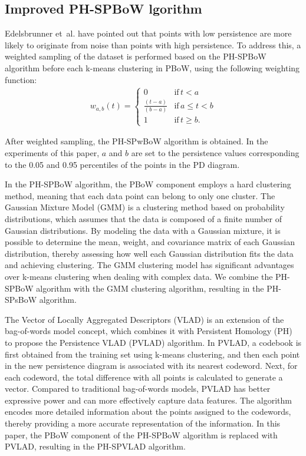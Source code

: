 \documentclass[5GeSdc,ASOC,numref,printGA,printHL,CASflow,nocrossmark,longtitle,PROOF]{/usr/local/texlive/iTemplates/01-Templates/01-Els-Jnl/01-Standard_Templates/V1/ELS_MDL5-V1-6}
\begin{document}
\begin{articlestyle}
\subsection{Improved PH-SPBoW lgorithm}\label{sec3.4}

Edelsbrunner et~al. \cite{edelsbrunner2010computational} have pointed out that points with low persistence are more likely to originate from noise than points with high persistence. To address this, a weighted sampling of the dataset is performed based on the PH-SPBoW algorithm before each k-means clustering in PBoW, using the following weighting function:  
\begin{align*}  
w_{a,b}(t) =  
\begin{cases}   
	0 & \text{if}\,t < a \\
	\frac{(t-a)}{(b-a)} & \text{if}\,a \leq t < b \\
	1 & \text{if}\,t \geq b.
\end{cases}  
\end{align*}  

After weighted sampling, the PH-SPwBoW algorithm is obtained. In the experiments of this paper, $ a $ and $ b $ are set to the persistence values corresponding to the 0.05 and 0.95 percentiles of the points in the PD diagram.  

In the PH-SPBoW algorithm, the PBoW component employs a hard clustering method, meaning that each data point can belong to only one cluster. The Gaussian Mixture Model (GMM) is a clustering method based on probability distributions, which assumes that the data is composed of a finite number of Gaussian distributions. By modeling the data with a Gaussian mixture, it is possible to determine the mean, weight, and covariance matrix of each Gaussian distribution, thereby assessing how well each Gaussian distribution fits the data and achieving clustering. The GMM clustering model has significant advantages over k-means clustering when dealing with complex data. We combine the PH-SPBoW algorithm with the GMM clustering algorithm, resulting in the PH-SPsBoW algorithm.

The Vector of Locally Aggregated Descriptors (VLAD) is an extension of the bag-of-words model concept, which combines it with Persistent Homology (PH) to propose the Persistence VLAD (PVLAD) algorithm. In PVLAD, a codebook is first obtained from the training set using k-means clustering, and then each point in the new persistence diagram is associated with its nearest codeword. Next, for each codeword, the total difference with all points is calculated to generate a vector. Compared to traditional bag-of-words models, PVLAD has better expressive power and can more effectively capture data features. The algorithm encodes more detailed information about the points assigned to the codewords, thereby providing a more accurate representation of the information. In this paper, the PBoW component of the PH-SPBoW algorithm is replaced with PVLAD, resulting in the PH-SPVLAD algorithm.


\end{articlestyle}
\end{document}
